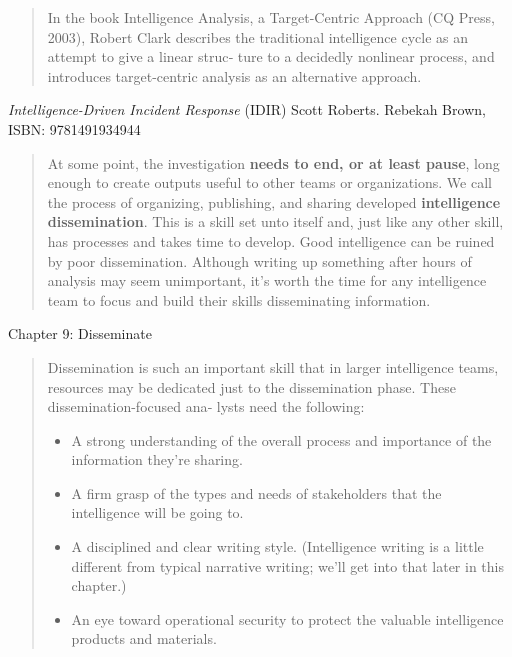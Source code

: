 \documentclass[Screen16to9,17pt]{foils}
\begin{document}




\begin{quote}
In the book Intelligence Analysis, a Target-Centric Approach (CQ Press, 2003), Robert
Clark describes the traditional intelligence cycle as an attempt to give a linear struc‐
ture to a decidedly nonlinear process, and introduces target-centric analysis as an
alternative approach.
\end{quote}




\emph{Intelligence-Driven Incident Response} (IDIR)
 Scott Roberts. Rebekah Brown, ISBN: 9781491934944

\begin{quote}
At some point, the investigation {\bf needs to end, or at least pause}, long enough to create outputs useful to other teams or organizations. We call the process of organizing, publishing, and sharing developed {\bf intelligence dissemination}. This is a skill set unto itself and, just like any other skill, has processes and takes time to develop. Good intelligence can be ruined by poor dissemination. Although writing up something after hours of analysis may seem unimportant, it’s worth the time for any intelligence team to focus and build their skills disseminating information.
\end{quote}

\begin{list2}
\item Chapter 9: Disseminate
\end{list2}



\begin{quote}
Dissemination is such an important skill that in larger intelligence teams, resources
may be dedicated just to the dissemination phase. These dissemination-focused ana‐
lysts need the following:
\begin{itemize}
\item A strong understanding of the overall process and importance of the information
they’re sharing.
\item A firm grasp of the types and needs of stakeholders that the intelligence will be
going to.
\item A disciplined and clear writing style. (Intelligence writing is a little different from typical narrative writing; we’ll get into that later in this chapter.)
\item An eye toward operational security to protect the valuable intelligence products
and materials.
\end{itemize}
\end{quote}
\end{document}
